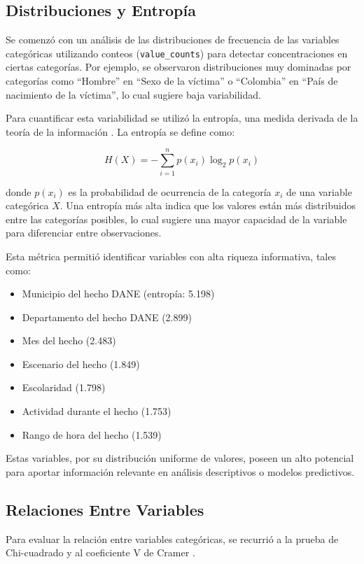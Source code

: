 \documentclass[lettersize,journal]{IEEEtran}
\begin{document}
\subsection{Distribuciones y Entropía}

Se comenzó con un análisis de las distribuciones de frecuencia de las variables categóricas utilizando conteos (\texttt{value\_counts}) para detectar concentraciones en ciertas categorías. Por ejemplo, se observaron distribuciones muy dominadas por categorías como ``Hombre'' en ``Sexo de la víctima'' o ``Colombia'' en ``País de nacimiento de la víctima'', lo cual sugiere baja variabilidad.

Para cuantificar esta variabilidad se utilizó la entropía, una medida derivada de la teoría de la información \cite{shannon1948mathematical}. La entropía se define como:

\[
H(X) = -\sum_{i=1}^{n} p(x_i) \log_2 p(x_i)
\]

donde $p(x_i)$ es la probabilidad de ocurrencia de la categoría $x_i$ de una variable categórica $X$. Una entropía más alta indica que los valores están más distribuidos entre las categorías posibles, lo cual sugiere una mayor capacidad de la variable para diferenciar entre observaciones.

Esta métrica permitió identificar variables con alta riqueza informativa, tales como:

\begin{itemize}
    \item Municipio del hecho DANE (entropía: 5.198)
    \item Departamento del hecho DANE (2.899)
    \item Mes del hecho (2.483)
    \item Escenario del hecho (1.849)
    \item Escolaridad (1.798)
    \item Actividad durante el hecho (1.753)
    \item Rango de hora del hecho (1.539)
\end{itemize}

Estas variables, por su distribución uniforme de valores, poseen un alto potencial para aportar información relevante en análisis descriptivos o modelos predictivos.

\subsection{Relaciones Entre Variables}

Para evaluar la relación entre variables categóricas, se recurrió a la prueba de Chi-cuadrado y al coeficiente V de Cramer \cite{backhaus2016multivariate}. 
\end{document}

